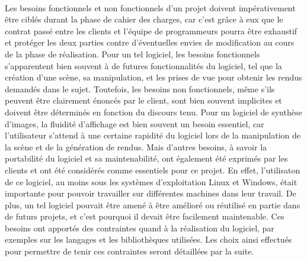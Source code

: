 \paragraph{}
        Les besoins fonctionnels et non fonctionnels d'un projet doivent impérativement être ciblés durant la phase de cahier des charges, car c'est grâce à eux que le contrat passé entre les clients et l'équipe de programmeurs pourra être exhaustif et protéger les deux parties contre d'éventuelles envies de modification au cours de la phase de réalisation. 
Pour un tel logiciel, les besoins fonctionnels s'apparentent bien souvent à de futures fonctionnalités du logiciel, tel que la création d'une scène, sa manipulation, et les prises de vue pour obtenir les rendus demandés dans le sujet. 
Toutefois, les besoins non fonctionnels, même s'ils peuvent être clairement énoncés par le client, sont bien souvent implicites et doivent être déterminés en fonction du discours tenu. Pour un logiciel de synthèse d'images, la fluidité d'affichage est bien souvent un besoin essentiel, car l'utilisateur s'attend à une certaine rapidité du logiciel lors de la manipulation de la scène et de la génération de rendus. Mais d'autres besoins, à savoir la portabilité du logiciel et sa maintenabilité, ont également été exprimés par les clients et ont été considérés comme essentiels pour ce projet. En effet, l'utilisaton de ce logiciel, au moins sous les systèmes d'exploitation Linux et Windows, était importante pour pouvoir travailler sur différentes machines dans leur travail. De plus, un tel logiciel pouvait être amené à être amélioré ou réutilisé en partie dans de futurs projets, et c'est pourquoi il devait être facilement maintenable.
Ces besoins ont apportés des contraintes quand à la réalisation du logiciel, par exemples sur les langages et les bibliothèques utilisées. Les choix ainsi effectués pour permettre de tenir ces contraintes seront détaillées par la suite.


